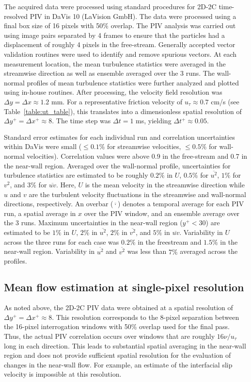 \documentclass[letterpaper,11pt]{article}
\begin{document}
The acquired data were processed using standard procedures for 2D-2C time-resolved PIV in DaVis 10 (LaVision GmbH).  The data were processed using a final box size of 16 pixels with 50$\%$ overlap.  The PIV analysis was carried out using image pairs separated by 4 frames to ensure that the particles had a displacement of roughly 4 pixels in the free-stream. Generally accepted vector validation routines were used to identify and remove spurious vectors. At each measurement location, the mean turbulence statistics were averaged in the streamwise direction as well as ensemble averaged over the 3 runs. The wall-normal profiles of mean turbulence statistics were further analyzed and plotted using in-house routines. After processing, the velocity field resolution was $\Delta y = \Delta  x \approx 1.2$ mm.  For a representative friction velocity of $u_\tau \approx 0.7$ cm/s (see Table~\ref{table:ut_table}), this translates into a dimensionless spatial resolution of $\Delta y^+ = \Delta  x^+ \approx 8$. The time step was $\Delta t = 1$ ms, yielding $\Delta t^+ \approx 0.05$.

Standard error estimates for each individual run and correlation uncertainties within DaVis \citep{wieneke2015piv} were small ($\le 0.1\%$ for streamwise velocities, $\le 0.5\%$ for wall-normal velocities).  Correlation values were above 0.9 in the free-stream and 0.7 in the near-wall region.  Averaged over the wall-normal profile, uncertainties for turbulence statistics are estimated to be roughly $0.2\%$ in $U$,  $0.5\%$ for $\overline{u^2}$, $1\%$ for $v^2$, and $3\%$ for $\overline{uv}$. Here, $U$ is the mean velocity in the streamwise direction while $u$ and $v$ are the turbulent velocity fluctuations in the streamwise and wall-normal directions, respectively. An overbar ($\overline{{\cdot}}$) denotes a temporal average for each PIV run, a spatial average in $x$ over the PIV window, and an ensemble average over the 3 runs. Maximum uncertainties in the near-wall region ($y^+ < 30$) are estimated to be $1\%$ in $U$, $2\%$ in $\overline{u^2}$, $2\%$ in $\overline{v^2}$, and $5\%$ in $\overline{uv}$. Variability in $U$ across the three runs for each case was $0.2\%$ in the freestream and $1.5\%$ in the near-wall region. Variability in $\overline{u^2}$ and $\overline{v^2}$ was less than $7\%$ averaged across the profiles.

\subsection{Mean flow estimation at single-pixel resolution}\label{sec:single-pixel}
As noted above, the 2D-2C PIV data were obtained at a spatial resolution of $\Delta y^+ = \Delta  x^+ \approx 8$.  This resolution corresponds to the 8-pixel separation between the 16-pixel interrogation windows with 50\% overlap used for the final pass.  Thus, the actual PIV correlation occurs over windows that are roughly $16\nu/u_\tau$ long in each direction. This leads to substantial spatial averaging in the near-wall region and does not provide sufficient spatial resolution for the evaluation of changes in the near-wall flow.  For example, an estimate of the interfacial slip velocity is impossible at this resolution.
\end{document}
